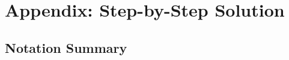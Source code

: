 \documentclass[11pt]{article}
\begin{document}










\section{Appendix: Step-by-Step Solution}


\subsection{Notation Summary}
\end{document}
